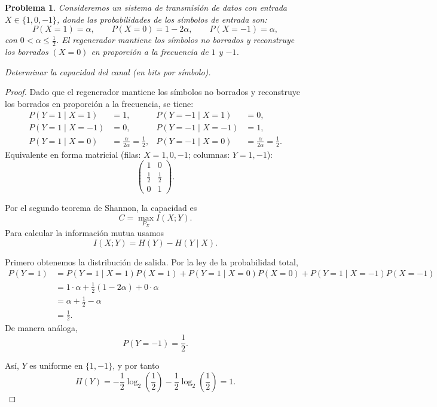 \documentclass[a4,10pt]{aleph-notas}
\newtheorem*{prob}{Problema}
\begin{document}
\encabezado

\begin{prob}
Consideremos un sistema de transmisión de datos con entrada
\(X\in\{1,0,-1\}\), donde las probabilidades de los símbolos de entrada son:
\[
    P(X=1)=\alpha,\qquad P(X=0)=1-2\alpha,\qquad P(X=-1)=\alpha,
\]
con \(0<\alpha\le \frac{1}{2}\). El regenerador mantiene los símbolos no borrados y reconstruye los borrados
\((X=0)\) en proporción a la frecuencia de \(1\) y \(-1\).

Determinar la capacidad del canal (en bits por símbolo).
\end{prob}

\begin{proof}
Dado que el regenerador mantiene los símbolos no borrados y reconstruye los borrados en proporción a la frecuencia, se tiene:
\begin{align*}
    P(Y=1\mid X=1)&=1,& P(Y=-1\mid X=1)&=0,\\
    P(Y=1\mid X=-1)&=0,& P(Y=-1\mid X=-1)&=1,\\
    P(Y=1\mid X=0)&=\frac{\alpha}{2\alpha}=\frac{1}{2},&
    P(Y=-1\mid X=0)&=\frac{\alpha}{2\alpha}=\frac{1}{2}.
\end{align*}
Equivalente en forma matricial (filas: \(X=1,0,-1\); columnas: \(Y=1,-1\)):
\[
    \begin{pmatrix}
    1 & 0 \\
    \frac{1}{2} & \frac{1}{2} \\
    0 & 1
    \end{pmatrix}.
\]

Por el segundo teorema de Shannon, la capacidad es
\[
    C=\max_{P_X} I(X;Y).
\]
Para calcular la información mutua usamos
\[
    I(X;Y)=H(Y)-H(Y\mid X).
\]

Primero obtenemos la distribución de salida. Por la ley de la probabilidad total,
\begin{align*}
    P(Y=1)
        &=P(Y=1\mid X=1)P(X=1)+P(Y=1\mid X=0)P(X=0)+P(Y=1\mid X=-1)P(X=-1)\\
        &=1\cdot \alpha+\frac{1}{2}(1-2\alpha)+0\cdot \alpha\\
        &=\alpha+\frac{1}{2}-\alpha\\
        &=\frac{1}{2}.
\end{align*}
De manera análoga,
\[
P(Y=-1)=\frac{1}{2}.
\]

Así, \(Y\) es uniforme en \(\{1,-1\}\), y por tanto
\[
    H(Y)=-\frac{1}{2}\log_2\left(\frac{1}{2}\right)-\frac{1}{2}\log_2\left(\frac{1}{2}\right)=1.
\]


\end{proof}
\end{document}
